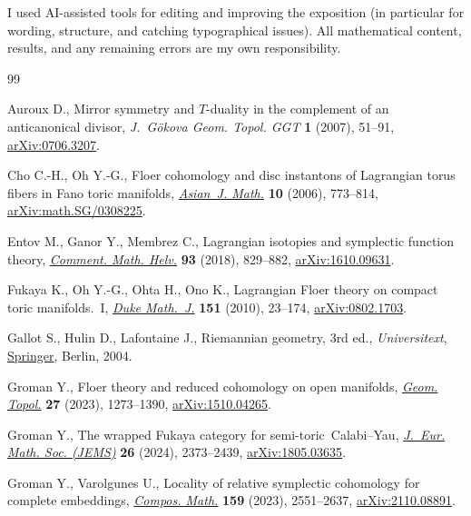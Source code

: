 \documentclass[pdftex]{sigma}
\numberwithin{equation}{section}
\theoremstyle{definition}
\begin{document}
I used AI-assisted tools for editing and improving the exposition (in particular for wording, structure, and catching typographical issues).
All mathematical content, results, and any remaining errors are my own responsibility.

\begin{thebibliography}{99}
\footnotesize\itemsep=0pt

Auroux D., Mirror symmetry and {$T$}-duality in the complement of an
 anticanonical divisor, \textit{J.~G\"okova Geom. Topol. GGT} \textbf{1}
 (2007), 51--91, \href{http://arxiv.org/abs/0706.3207}{arXiv:0706.3207}.

Cho C.-H., Oh Y.-G., Floer cohomology and disc instantons of {L}agrangian torus
 fibers in {F}ano toric manifolds,
 \href{https://doi.org/10.4310/AJM.2006.v10.n4.a10}{\textit{Asian~J. Math.}}
 \textbf{10} (2006), 773--814,
 \href{http://arxiv.org/abs/math.SG/0308225}{arXiv:math.SG/0308225}.

Entov M., Ganor Y., Membrez C., Lagrangian isotopies and symplectic function
 theory, \href{https://doi.org/10.4171/CMH/451}{\textit{Comment. Math. Helv.}}
 \textbf{93} (2018), 829--882,
 \href{http://arxiv.org/abs/1610.09631}{arXiv:1610.09631}.

Fukaya K., Oh Y.-G., Ohta H., Ono K., Lagrangian {F}loer theory on compact toric
 manifolds.~{I}, \href{https://doi.org/10.1215/00127094-2009-062}{\textit{Duke
 Math.~J.}} \textbf{151} (2010), 23--174,
 \href{http://arxiv.org/abs/0802.1703}{arXiv:0802.1703}.

Gallot S., Hulin D., Lafontaine J., Riemannian geometry, 3rd ed., \textit{Universitext},
 \href{https://doi.org/10.1007/978-3-642-18855-8}{Springer}, Berlin, 2004.

Groman Y., Floer theory and reduced cohomology on open manifolds,
 \href{https://doi.org/10.2140/gt.2023.27.1273}{\textit{Geom. Topol.}}
 \textbf{27} (2023), 1273--1390,
 \href{http://arxiv.org/abs/1510.04265}{arXiv:1510.04265}.

Groman Y., The wrapped {F}ukaya category for semi-toric~{C}alabi--{Y}au,
 \href{https://doi.org/10.4171/jems/1466}{\textit{J.~Eur. Math. Soc. (JEMS)}}
 \textbf{26} (2024), 2373--2439,
 \href{http://arxiv.org/abs/1805.03635}{arXiv:1805.03635}.

Groman Y., Varolgunes U., Locality of relative symplectic cohomology for
 complete embeddings,
 \href{https://doi.org/10.1112/s0010437x23007492}{\textit{Compos. Math.}}
 \textbf{159} (2023), 2551--2637,
 \href{http://arxiv.org/abs/2110.08891}{arXiv:2110.08891}.


\end{thebibliography}
\end{document}

